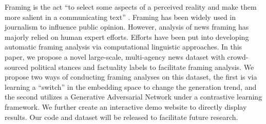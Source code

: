 Framing is the act ``to select some aspects of a perceived reality and make them more salient in a communicating text'' \cite{entman1993}. Framing has been widely used in journalism to influence public opinion. However, analysis of news framing has majorly relied on human expert efforts. Efforts have been put into developing automatic framing analysis via computational linguistic approaches. In this paper, we propose a novel large-scale, multi-agency news dataset with crowd-sourced political stances and factuality labels to facilitate framing analysis. We propose two ways of conducting framing analyses on this dataset, the first is via learning a ``switch'' in the embedding space to change the generation trend, and the second utilizes a Generative Adversarial Network under a contrastive learning framework. We further create an interactive demo website to directly display results. Our code and dataset will be released to facilitate future research.